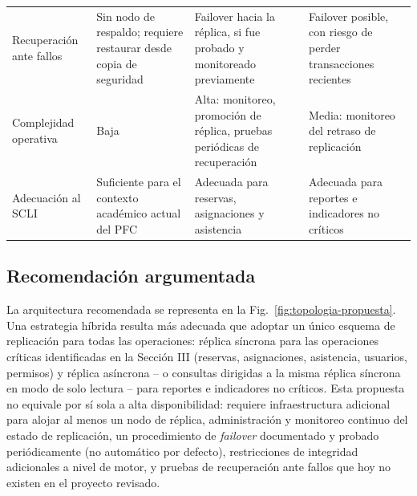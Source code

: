 \documentclass[conference]{IEEEtran}
\begin{document}
\begin{table}[!t]
\begin{tabularx}{\textwidth}{@{}l X X X@{}}
Recuperaci\'on ante fallos & Sin nodo de respaldo; requiere restaurar desde copia de seguridad & Failover hacia la r\'eplica, si fue probado y monitoreado previamente & Failover posible, con riesgo de perder transacciones recientes \\
Complejidad operativa & Baja & Alta: monitoreo, promoci\'on de r\'eplica, pruebas peri\'odicas de recuperaci\'on & Media: monitoreo del retraso de replicaci\'on \\
Adecuaci\'on al SCLI & Suficiente para el contexto acad\'emico actual del PFC & Adecuada para reservas, asignaciones y asistencia & Adecuada para reportes e indicadores no cr\'iticos \\
\bottomrule
\end{tabularx}
\end{table}

\subsection{Recomendaci\'on argumentada}

La arquitectura recomendada se representa en la Fig.~\ref{fig:topologia-propuesta}. Una estrategia h\'ibrida resulta m\'as adecuada que adoptar un \'unico esquema de replicaci\'on para todas las operaciones: r\'eplica s\'incrona para las operaciones cr\'iticas identificadas en la Secci\'on III (reservas, asignaciones, asistencia, usuarios, permisos) y r\'eplica as\'incrona -- o consultas dirigidas a la misma r\'eplica s\'incrona en modo de solo lectura -- para reportes e indicadores no cr\'iticos. Esta propuesta no equivale por s\'i sola a alta disponibilidad: requiere infraestructura adicional para alojar al menos un nodo de r\'eplica, administraci\'on y monitoreo continuo del estado de replicaci\'on, un procedimiento de \emph{failover} documentado y probado peri\'odicamente (no autom\'atico por defecto), restricciones de integridad adicionales a nivel de motor, y pruebas de recuperaci\'on ante fallos que hoy no existen en el proyecto revisado.
\end{document}
